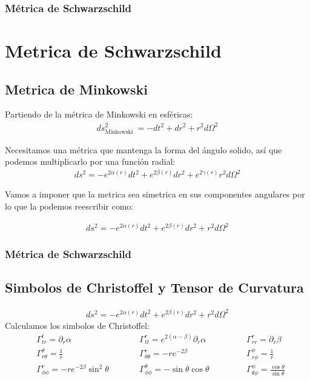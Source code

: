 \documentclass{beamer}
\begin{document}
\begin{frame}
\frametitle{Métrica de Schwarzschild}
\section{Metrica de Schwarzschild}
\subsection{Metrica de Minkowski}

Partiendo de la métrica de Minkowski en esféricas: 
\begin{gather*}
  ds^2 _{\text{Minkowski }}  = - dt^2 + dr^2 + r^2 d \Omega^2
\end{gather*}

Necesitamos una métrica que mantenga la forma del ángulo solido, así que podemos multiplicarlo por una función radial:
\begin{gather*}
  ds^2 = - e ^ {2 \alpha (r) } dt^2 + e ^ {2 \beta(r) } dr^2 + e ^ {2\gamma(r)}r^2 d \Omega^2 
\end{gather*}

Vamos a imponer que la metrica sea simetrica en sus componentes angulares por lo que la podemos reescribir como:

\begin{gather*}
  ds^2 = - e ^ {2\alpha(r)}dt^2 + e ^ {2 \beta (r) } dr^2 + r^2 d \Omega^2  
\end{gather*}

\end{frame}




\begin{frame}
\frametitle{Métrica de Schwarzschild}
\subsection{Simbolos de Christoffel y Tensor de Curvatura}

\begin{gather*}
  ds^2 = - e ^ {2\alpha(r)}dt^2 + e ^ {2 \beta (r) } dr^2 + r^2 d \Omega^2  
\end{gather*}
Calculamos los simbolos de Christoffel:
\begin{align*}
  &\Gamma_{t r}^t=\partial _r \alpha \qquad &&\Gamma_{t t}^r=e^{2(\alpha-\beta)} \partial_r \alpha \qquad &&&\Gamma_{r r}^{r}=\partial_r \beta \\
  &\Gamma_{r \theta}^\theta=\frac{1}{r} \qquad &&\Gamma_{\theta \theta}^r=-r e^{-2 \beta} \qquad &&&\Gamma_{r \phi}^\phi=\frac{1}{r} \\
  &\Gamma_{\phi \phi}^r=-r e^{-2 \beta} \sin ^2 \theta \qquad &&\Gamma_{\phi \phi}^\theta=-\sin \theta \cos \theta \qquad &&&\Gamma_{\theta \phi}^\phi=\frac{\cos \theta}{\sin \theta}
\end{align*}
\end{frame}
\end{document}
